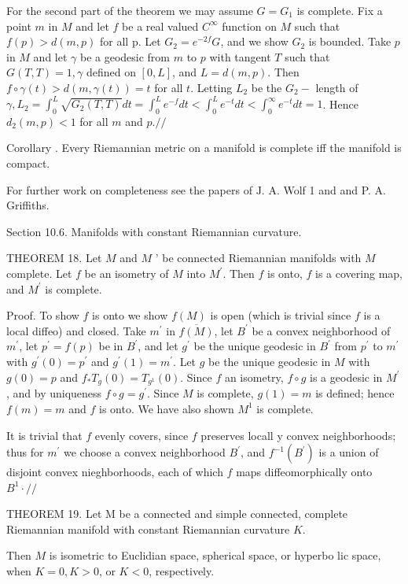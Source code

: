 \documentclass[10pt]{article}
\begin{document}
For the second part of the theorem we may assume $G=G_{1}$ is complete. Fix a point $m$ in $M$ and let $f$ be a real valued $C^{\infty}$ function on $M$ such that $f(p)>d(m, p)$ for all p. Let $G_{2}=e^{-2 f} G$, and we show $G_{2}$ is bounded. Take $p$ in $M$ and let $\gamma$ be a geodesic from $m$ to $p$ with tangent $T$ such that $G(T, T)=1, \gamma$ defined on $[0, L]$, and $L=d(m, p)$. Then $f \circ \gamma(t)>d(m, \gamma(t))=t$ for all $t$. Letting $L_{2}$ be the $G_{2}-$ length of $\gamma, L_{2}=\int_{0}^{L} \sqrt{G_{2}(T, T)} d t=\int_{0}^{L} e^{-f} d t<\int_{0}^{L} e^{-t} d t<\int_{0}^{\infty} e^{-t} d t=1$. Hence $d_{2}(m, p)<1$ for all $m$ and $p . / /$

Corollary . Every Riemannian metric on a manifold is complete iff the manifold is compact.

For further work on completeness see the papers of $\mathrm{J}$. A. Wolf 1 and and P. A. Griffiths.

Section 10.6. Manifolds with constant Riemannian curvature.

THEOREM 18. Let $M$ and $M$ ' be connected Riemannian manifolds with $M$ complete. Let $f$ be an isometry of $M$ into $M^{\prime}$. Then $f$ is onto, $f$ is a covering map, and $M^{\prime}$ is complete.

Proof. To show $f$ is onto we show $f(M)$ is open (which is trivial since $f$ is a local diffeo) and closed. Take $m^{\prime}$ in $\overline{f(M)}$, let $B^{\prime}$ be a convex neighborhood of $m^{\prime}$, let $p^{\prime}=f(p)$ be in $B^{\prime}$, and let $g^{\prime}$ be the unique geodesic in $B^{\prime}$ from $p^{\prime}$ to $m^{\prime}$ with $g^{\prime}(0)=p^{\prime}$ and $g^{\prime}(1)=m^{\prime}$. Let $g$ be the unique geodesic in $M$ with $g(0)=p$ and $f_{*} T_{g}(0)=T_{g^{1}}(0)$. Since $f$ an isometry, $f \circ g$ is a geodesic in $M^{\prime}$, and by uniqueness $f \circ g=g^{\prime}$. Since $M$ is complete, $g(1)=m$ is defined; hence $f(m)=m$ and $f$ is onto. We have also shown $M^{1}$ is complete.

It is trivial that $f$ evenly covers, since $f$ preserves locall y convex neighborhoods; thus for $m^{\prime}$ we choose a convex neighborhood $B^{\prime}$, and $f^{-1}\left(B^{\prime}\right)$ is a union of disjoint convex nieghborhoods, each of which $f$ maps diffeomorphically onto $B^{1} \cdot / /$

THEOREM 19. Let M be a connected and simple connected, complete Riemannian manifold with constant Riemannian curvature $K$.

Then $M$ is isometric to Euclidian space, spherical space, or hyperbo lic space, when $K=0, K>0$, or $K<0$, respectively.
\end{document}
